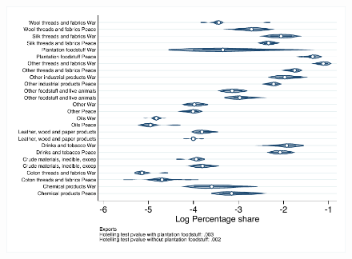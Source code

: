 \documentclass[12pt,a4paper,notitlepage,english]{article}
\begin{document}
\begin{figure}
\includegraphics[scale=.63]{post_seven_distribution_X}
\end{figure}
\end{document}
